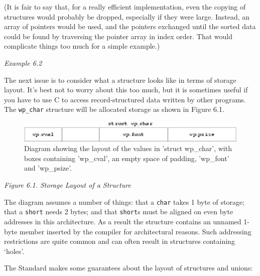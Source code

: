    (It is fair to say that, for a really efficient implementation, even the
    copying of structures would probably be dropped, especially if they were
    large. Instead, an array of pointers would be used, and the pointers
    exchanged until the sorted data could be found by traversing the pointer
    array in index order. That would complicate things too much for a simple
    example.)


   \begin{center}\textit{Example 6.2}\end{center}


   The next issue is to consider what a structure looks like in terms of
    storage layout. It's best not to worry about this too much, but it is
    sometimes useful if you have to use C to access record-structured data
    written by other programs. The \texttt{wp\_char} structure will be
    allocated storage as shown in Figure 6.1.


   \begin{figure}\centering\includegraphics[type=pdf,read=.pdf,ext=.pdf,scale=1.0]{figure/6.1}\caption{Diagram showing the layout of the values in 'struct wp\_char',            with boxes containing 'wp\_cval', an empty space of padding,            'wp\_font' and 'wp\_psize'.}\end{figure}

\begin{center}\textit{Figure 6.1. Storage Layout of a Structure}\end{center}


   The diagram assumes a number of things: that a \texttt{char} takes
    1 byte of storage; that a \texttt{short} needs 2 bytes; and that
    \texttt{short}s must be aligned on even byte addresses in this
    architecture. As a result the structure contains an unnamed 1-byte member
    inserted by the compiler for architectural reasons. Such addressing
    restrictions are quite common and can often result in structures containing
    `holes'.


   The Standard makes some guarantees about the layout of structures and
    unions:



